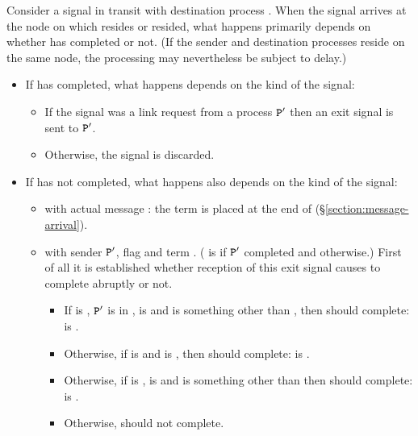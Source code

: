 Consider a signal in transit with destination process .
When the signal arrives at the node on which  resides or resided,
what happens primarily depends on whether  has completed or not.
(If the sender and destination processes reside on the same node, the processing
may nevertheless be subject to delay.)
\begin{itemize}
\item If  has completed, what happens depends on the kind of the signal:
\begin{itemize}
\item {}If the signal was a link request from a process ${\tt{\sl P}}'$
then an exit signal 
is sent to ${\tt{\sl P}}'$.
\item Otherwise, the signal is discarded.
\end{itemize}
\item If  has not completed, what happens also depends on the kind of the signal:
\begin{itemize}
\item {} with actual message :
the term  is placed at the end of
 (\S\ref{section:message-arrival}).
\item {}
 with sender ${\tt{\sl P}}'$, flag  and term .
( is  if ${\tt{\sl P}}'$ completed and  otherwise.)
First of all it is established whether reception of this exit signal causes 
to complete abruptly or not.
\begin{itemize}
\item If  is , ${\tt{\sl P}}'$ is in ,
 is  and  is something other than
,
then  should complete:  is .
\item Otherwise, if  is  and  is
,
then  should complete:  is
.
\item Otherwise, if  is ,  is 
and  is something other than 
then  should complete:  is .
\item Otherwise,  should not complete.
\end{itemize}


\end{itemize}
\end{itemize}
